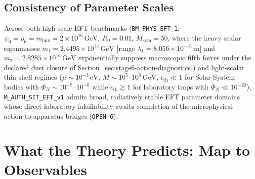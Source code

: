 \subsection{Consistency of Parameter Scales}

Across both high-scale EFT benchmarks (\texttt{BM\_PHYS\_EFT\_1}: $\psi_0 = \rho_0 = m_{\mathrm{link}} = 2\times 10^{16}\,\mathrm{GeV}$, $R_0 = 0.01$, $M_{\mathrm{sym}} = 50$, where the heavy scalar eigenmasses $m_1 = 2.4495\times 10^{14}\,\mathrm{GeV}$ [range $\lambda_1 = 8.056\times 10^{-31}\,\mathrm{m}$] and $m_2 = 2.8285\times 10^{16}\,\mathrm{GeV}$ exponentially suppress macroscopic fifth forces under the declared dust closure of Section~\ref{sec:stage6-action-diagnostics}) and light-scalar thin-shell regimes ($\mu \sim 10^{-3}\,\mathrm{eV}$, $M \sim 10^5\text{--}10^6\,\mathrm{GeV}$, $\epsilon_{\mathrm{th}} \ll 1$ for Solar System bodies with $\Phi_N \sim 10^{-9}\text{--}10^{-6}$ while $\epsilon_{\mathrm{th}} \gtrsim 1$ for laboratory traps with $\Phi_N \ll 10^{-20}$), \texttt{M\_AUTH\_SIT\_EFT\_v1} admits broad, radiatively stable EFT parameter domains whose direct laboratory falsifiability awaits completion of the microphysical action-to-apparatus bridges (\texttt{OPEN-6}).

\section{What the Theory Predicts: Map to Observables}
\label{sec:map-to-observables}

